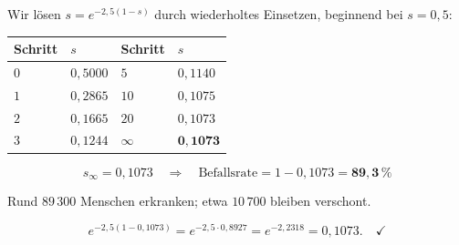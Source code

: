 \begin{merksatz}
Wir lösen $s = e^{-2{,}5(1-s)}$ durch wiederholtes Einsetzen, beginnend bei $s = 0{,}5$:

\begin{center}
{\small
\renewcommand{\arraystretch}{1.38}
\begin{tabular}{@{}P{1.2cm}P{2.0cm}P{1.2cm}P{2.0cm}@{}}
\toprule
Schritt & $s$ & Schritt & $s$\\
\midrule
$0$ & $0{,}5000$ & $5$ & $0{,}1140$\\
$1$ & $0{,}2865$ & $10$ & $0{,}1075$\\
$2$ & $0{,}1665$ & $20$ & $0{,}1073$\\
$3$ & $0{,}1244$ & $\infty$ & $\mathbf{0{,}1073}$\\
\bottomrule
\end{tabular}}
\end{center}

\[ s_\infty = 0{,}1073 \quad\Longrightarrow\quad \text{Befallsrate} = 1 - 0{,}1073 = \mathbf{89{,}3\,\%} \]

Rund $89\,300$ Menschen erkranken; etwa $10\,700$ bleiben verschont.

\[ e^{-2{,}5(1-0{,}1073)} = e^{-2{,}5 \cdot 0{,}8927} = e^{-2{,}2318} = 0{,}1073 . \quad \checkmark \]
\end{merksatz}


